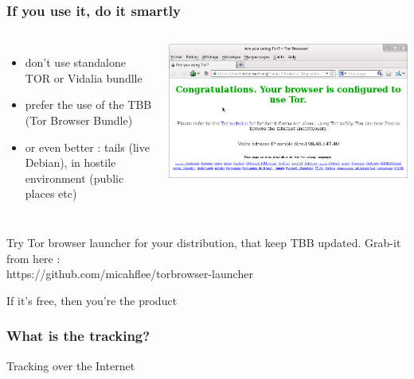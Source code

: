 \begin{frame}
\frametitle{If you use it, do it smartly}
\begin{columns}[c]
\begin{itemize}
\item don't use standalone TOR or Vidalia bundlle
\item prefer the use of the TBB (Tor Browser Bundle)
\item or even better : tails (live Debian), in hostile environment
(public places etc)
\end{itemize}
\includegraphics[keepaspectratio,width=\textwidth, height=.8\textheight]{./materials/tbb}
\end{columns}
Try Tor browser launcher for your distribution, that keep TBB updated. Grab-it
from here :\\ https://github.com/micahflee/torbrowser-launcher
\end{frame}
\begin{frame}
\begin{center}
\Huge{If it's free, then you're the product}
\end{center}
\end{frame}

\begin{frame}
\frametitle{What is the tracking?}

\begin{block}{Tracking over the Internet}
\begin{itemize}
\end{itemize}
\end{block}
\end{frame}


